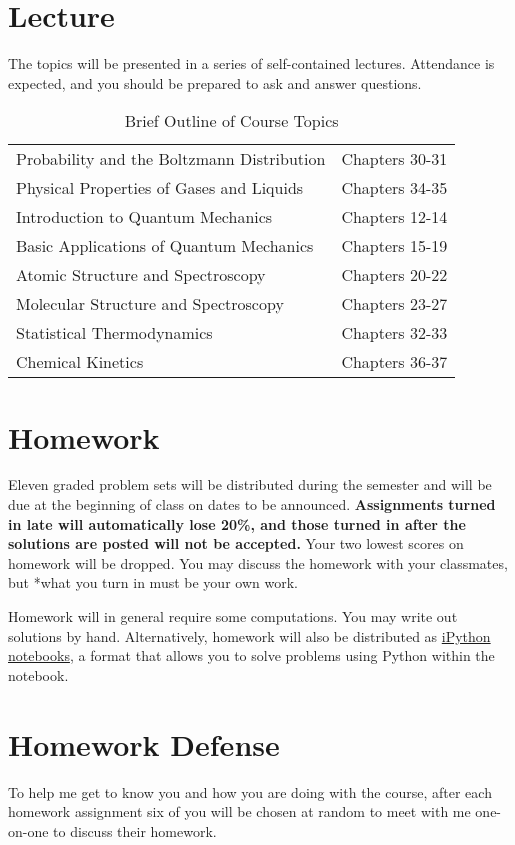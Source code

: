 \documentclass[11pt]{article}
\begin{document}
\section{Lecture}
\label{sec:orgf89b7bf}
The topics will be presented in a series of self-contained
lectures. Attendance is expected, and you should be prepared to ask
and answer questions.  

\begin{table}[htbp]
\caption{Brief Outline of Course Topics}
\centering
\begin{tabular}{ll}
\hline
Probability and the Boltzmann Distribution & Chapters 30-31\\
Physical Properties of Gases and Liquids & Chapters 34-35\\
Introduction to Quantum Mechanics & Chapters 12-14\\
Basic Applications of Quantum Mechanics & Chapters 15-19\\
Atomic Structure and Spectroscopy & Chapters 20-22\\
Molecular Structure and Spectroscopy & Chapters 23-27\\
Statistical Thermodynamics & Chapters 32-33\\
Chemical Kinetics & Chapters 36-37\\
\hline
\end{tabular}
\end{table}

\section{Homework}
\label{sec:orga5651df}
Eleven graded problem sets will be distributed during the semester and will be due at the beginning of class on dates to be announced.  \textbf{Assignments turned in late will automatically lose 20\%, and those turned in after the solutions are posted will not be accepted.}  Your two lowest scores on homework will be dropped.  You may discuss the homework with your classmates, but *what you turn in must be your own work.

Homework will in general require some computations. You may write out solutions by hand. Alternatively, homework will also be distributed as \href{https://ipython.org/notebook.html}{iPython notebooks}, a format that allows you to solve problems using Python within the notebook.
\section{Homework Defense}
\label{sec:orgd06a1cf}
To help me get to know you and how you are doing with the course, after each homework assignment six of you will be chosen at random to meet with me one-on-one to discuss their homework.
\end{document}
